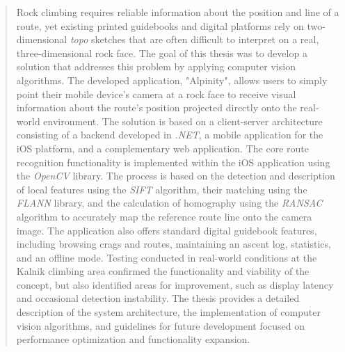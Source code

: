     \begin{abstract}

        Rock climbing requires reliable information about the position and line of a route, yet existing printed guidebooks and digital platforms rely on two-dimensional \textit{topo} sketches that are often difficult to interpret on a real, three-dimensional rock face. The goal of this thesis was to develop a solution that addresses this problem by applying computer vision algorithms. The developed application, "Alpinity", allows users to simply point their mobile device's camera at a rock face to receive visual information about the route's position projected directly onto the real-world environment.
        The solution is based on a client-server architecture consisting of a backend developed in \textit{.NET}, a mobile application for the iOS platform, and a complementary web application. The core route recognition functionality is implemented within the iOS application using the \textit{OpenCV} library. The process is based on the detection and description of local features using the \textit{SIFT} algorithm, their matching using the \textit{FLANN} library, and the calculation of homography using the \textit{RANSAC} algorithm to accurately map the reference route line onto the camera image. The application also offers standard digital guidebook features, including browsing crags and routes, maintaining an ascent log, statistics, and an offline mode.
        Testing conducted in real-world conditions at the Kalnik climbing area confirmed the functionality and viability of the concept, but also identified areas for improvement, such as display latency and occasional detection instability. The thesis provides a detailed description of the system architecture, the implementation of computer vision algorithms, and guidelines for future development focused on performance optimization and functionality expansion.
    
    \end{abstract}


